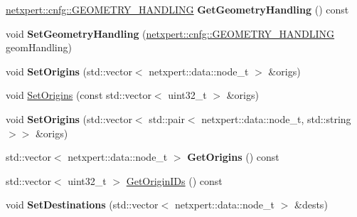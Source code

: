 \begin{DoxyCompactItemize}
\item 
\hyperlink{namespacenetxpert_1_1cnfg_a1514d3ae51414bf0bcd8d1fe8e868b89}{netxpert\+::cnfg\+::\+G\+E\+O\+M\+E\+T\+R\+Y\+\_\+\+H\+A\+N\+D\+L\+I\+NG} {\bfseries Get\+Geometry\+Handling} () const \hypertarget{classnetxpert_1_1OriginDestinationMatrix_a4c13924e741f428b858126b4cee8fc5c}{}\label{classnetxpert_1_1OriginDestinationMatrix_a4c13924e741f428b858126b4cee8fc5c}

\item 
void {\bfseries Set\+Geometry\+Handling} (\hyperlink{namespacenetxpert_1_1cnfg_a1514d3ae51414bf0bcd8d1fe8e868b89}{netxpert\+::cnfg\+::\+G\+E\+O\+M\+E\+T\+R\+Y\+\_\+\+H\+A\+N\+D\+L\+I\+NG} geom\+Handling)\hypertarget{classnetxpert_1_1OriginDestinationMatrix_a429a93b66e57d7a1c1a4d621b4676162}{}\label{classnetxpert_1_1OriginDestinationMatrix_a429a93b66e57d7a1c1a4d621b4676162}

\item 
void {\bfseries Set\+Origins} (std\+::vector$<$ netxpert\+::data\+::node\+\_\+t $>$ \&origs)\hypertarget{classnetxpert_1_1OriginDestinationMatrix_ae799703ff303d31e2c26b4bced78ac43}{}\label{classnetxpert_1_1OriginDestinationMatrix_ae799703ff303d31e2c26b4bced78ac43}

\item 
void \hyperlink{classnetxpert_1_1OriginDestinationMatrix_af6235667a08d4fca3b1d88cbb4fec513}{Set\+Origins} (const std\+::vector$<$ uint32\+\_\+t $>$ \&origs)
\item 
void {\bfseries Set\+Origins} (std\+::vector$<$ std\+::pair$<$ netxpert\+::data\+::node\+\_\+t, std\+::string $>$$>$ \&origs)\hypertarget{classnetxpert_1_1OriginDestinationMatrix_a6842884d4c037bfaf21f892c4bc49f39}{}\label{classnetxpert_1_1OriginDestinationMatrix_a6842884d4c037bfaf21f892c4bc49f39}

\item 
std\+::vector$<$ netxpert\+::data\+::node\+\_\+t $>$ {\bfseries Get\+Origins} () const \hypertarget{classnetxpert_1_1OriginDestinationMatrix_a070086cd6c9dfd56c6d647bdb4d1f044}{}\label{classnetxpert_1_1OriginDestinationMatrix_a070086cd6c9dfd56c6d647bdb4d1f044}

\item 
std\+::vector$<$ uint32\+\_\+t $>$ \hyperlink{classnetxpert_1_1OriginDestinationMatrix_ad18ee15d95918031e6e69af7cced7be8}{Get\+Origin\+I\+Ds} () const 
\item 
void {\bfseries Set\+Destinations} (std\+::vector$<$ netxpert\+::data\+::node\+\_\+t $>$ \&dests)\hypertarget{classnetxpert_1_1OriginDestinationMatrix_a85be24fc41f55f43c371e531ea9c3814}{}\label{classnetxpert_1_1OriginDestinationMatrix_a85be24fc41f55f43c371e531ea9c3814}


\end{DoxyCompactItemize}

